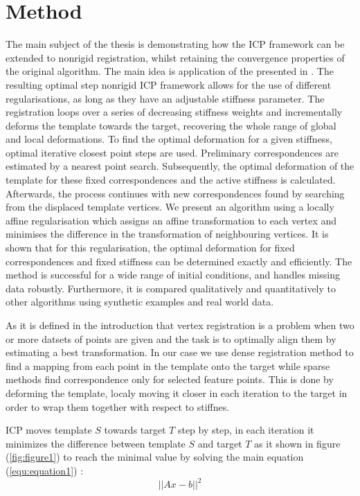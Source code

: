\documentclass[../structure.tex]{subfiles}
\begin{document}
\chapter{Method}
\hspace{2em}The main subject of the thesis is demonstrating how the ICP framework can be extended to nonrigid registration, whilst retaining the convergence properties of the original algorithm. The main idea is application of the presented in \cite{Amberg2007}. The resulting optimal step nonrigid ICP framework allows for the use of different regularisations, as long as they have an adjustable stiffness parameter. The registration loops over a series of decreasing stiffness weights and incrementally deforms the template towards the target, recovering the whole range of global and local deformations. To find the optimal deformation for a given stiffness, optimal iterative closest point steps are used. Preliminary correspondences are estimated by a nearest point search. Subsequently, the optimal deformation of the template for these fixed correspondences and the active stiffness is calculated. Afterwards, the process continues with new correspondences found by searching from the displaced template vertices. We present an algorithm using a locally affine regularisation which assigns an affine transformation to each vertex and minimises the difference in the transformation of neighbouring vertices. It is shown that for this regularisation, the optimal deformation for fixed correspondences and fixed stiffness can be determined exactly and efficiently. The method is successful for a wide range of initial conditions, and handles missing data robustly. Furthermore, it is compared qualitatively and quantitatively to other algorithms using synthetic examples and real world data.

\hspace{2em}As it is defined in the introduction that vertex registration is a problem when two or more datsets of points are given and the task is to optimally align them by estimating a best transformation. In our case we use dense registration method to find a mapping from each point in the template onto the target while sparse methods find correspondence only for selected feature points. This is done by deforming the template, localy moving it closer in each iteration to the target in order to wrap them together with respect to stiffnes.

\hspace{2em}ICP moves template $S$ towards target $T$ step by step, in each iteration it minimizes the difference between template $S$ and target $T$ as it shown in figure (\ref{fig:figure1}) to reach the minimal value by solving the main equation (\ref{equ:equation1}) :
\begin{equation}
\label{equ:equation1}
||Ax-b||^2
\end{equation}
\end{document}
